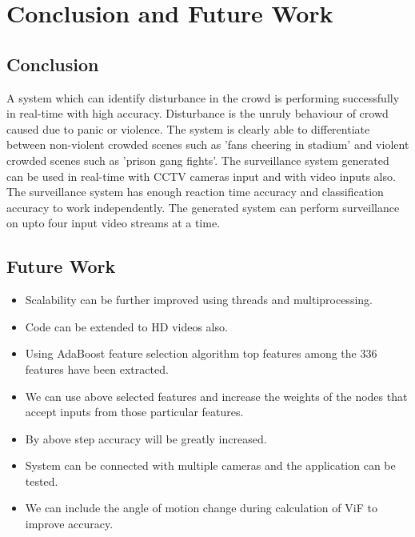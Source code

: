 \chapter{Conclusion and Future Work}
\section{Conclusion}
A system which can identify disturbance in the crowd is performing successfully in real-time with high accuracy. Disturbance is the unruly behaviour of crowd caused due to panic or violence. The system is clearly able to differentiate between non-violent crowded scenes such as 'fans cheering in stadium' and violent crowded scenes such as 'prison gang fights'. The surveillance system generated can be used in real-time with CCTV cameras input and with video inputs also. The surveillance system has enough reaction time accuracy and classification accuracy to work independently. The generated system can perform surveillance on upto four input video streams at a time.

\section{Future Work}
\begin{itemize}
	\item Scalability can be further improved using threads and multiprocessing.
	\item Code can be extended to HD videos also.
	\item Using AdaBoost feature selection algorithm top features among the 336 features have been extracted.
	\item We can use above selected features and increase the weights of the nodes that accept inputs from those particular features.
	\item By above step accuracy will be greatly increased.
	\item System can be connected with multiple cameras and the application can be tested.
	\item We can include the angle of motion change during calculation of ViF to improve accuracy.
\end{itemize}